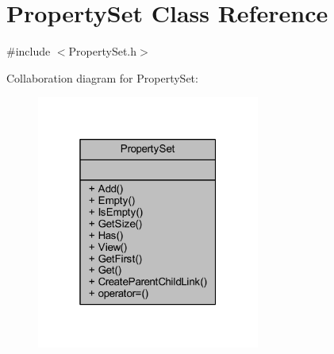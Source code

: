 \hypertarget{class_property_set}{}\section{Property\+Set Class Reference}
\label{class_property_set}


{\ttfamily \#include $<$Property\+Set.\+h$>$}



Collaboration diagram for Property\+Set\+:\nopagebreak
\begin{figure}[H]
\begin{center}
\leavevmode
\includegraphics[width=208pt]{class_property_set__coll__graph}
\end{center}
\end{figure}
